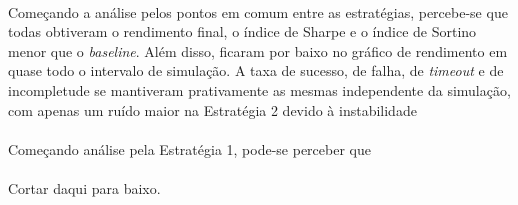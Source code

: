 \paragraph{} Começando a análise pelos pontos em comum entre as estratégias, percebe-se que todas obtiveram o rendimento final, o índice de Sharpe e o índice de Sortino menor que o \textit{baseline}. Além disso, ficaram por baixo no gráfico de rendimento em quase todo o intervalo de simulação. A taxa de sucesso, de falha, de \textit{timeout} e de incompletude se mantiveram prativamente as mesmas independente da simulação, com apenas um ruído maior na Estratégia 2 devido à instabilidade

\paragraph{} Começando análise pela Estratégia 1, pode-se perceber que





\paragraph{} Cortar daqui para baixo.






